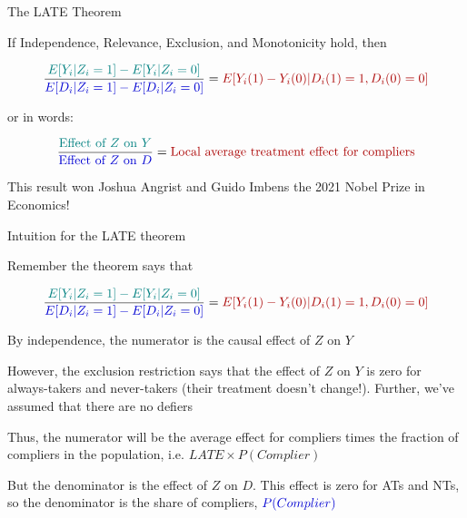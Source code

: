 \documentclass[11pt,english,handout]{beamer}
\newenvironment{wideitemize}{\itemize\addtolength{\itemsep}{10pt}}{\enditemize}
\begin{document}
\begin{frame}{The LATE Theorem}

	\begin{wideitemize}
		\item
		If Independence, Relevance, Exclusion, and Monotonicity hold, then 
		
		$$ \dfrac{ \color{teal} E[Y_i | Z_i = 1] - E[Y_i | Z_i = 0 ]  }{  \color{blue} E[D_i | Z_i = 1] - E[D_i | Z_i = 0 ]   }  = {\color{red} E[Y_i(1) - Y_i(0) | D_i(1) = 1, D_i(0) = 0 ] } $$
		
		\noindent or in words:
		
		$$ \dfrac{ \color{teal} \text{Effect of $Z$ on $Y$}  }{  \color{blue} \text{Effect of $Z$ on $D$}   }  = {\color{red} \text{Local average treatment effect for compliers} } $$
		
		
		\pause
		\item
		This result won Joshua Angrist and Guido Imbens the 2021 Nobel Prize in Economics!
		
	\end{wideitemize}	
\end{frame}


\begin{frame}{Intuition for the LATE theorem}
\begin{wideitemize}
	\item
	Remember the theorem says that 
	
	$$ \dfrac{ \color{teal} E[Y_i | Z_i = 1] - E[Y_i | Z_i = 0 ]  }{  \color{blue} E[D_i | Z_i = 1] - E[D_i | Z_i = 0 ]   }  = {\color{red} E[Y_i(1) - Y_i(0) | D_i(1) = 1, D_i(0) = 0 ] } $$
	
	\pause
	\item
	By independence, the {\color{teal} numerator} is the causal effect of $Z$ on $Y$
	
	\pause
	\item
	However, the exclusion restriction says that the effect of $Z$ on $Y$ is zero for always-takers and never-takers (their treatment doesn't change!). \pause Further, we've assumed that there are no defiers
	
	\pause
	\item
	Thus,  the {\color{teal} numerator} will be the average effect for compliers times the fraction of compliers in the population, i.e. {\color{teal}  $LATE \times P(Complier)$ } 
	
	\pause
	\item
	But the {\color{blue} denominator} is the effect of $Z$ on $D$. This effect is zero for ATs and NTs, so the denominator is the share of compliers, ${\color{blue}  P(Complier)}$ 
	
\end{wideitemize}	
\end{frame}
\end{document}
